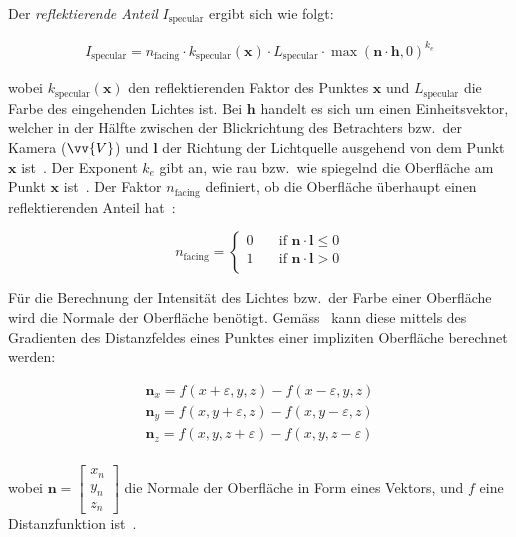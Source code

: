 Der \textit{reflektierende Anteil} $I_{\text{specular}}$ ergibt sich
wie folgt:

\begin{gather}
    I_{\text{specular}} = n_{\text{facing}} \cdot k_{\text{specular}}(\bm{x}) \cdot L_{\text{specular}} \cdot \max{(\bm{n} \cdot \bm{h}, 0)}^{k_{e}}
\end{gather}

wobei $k_{\text{specular}}(\bm{x})$ den reflektierenden Faktor des
Punktes $\bm{x}$ und $L_{\text{specular}}$ die Farbe des eingehenden
Lichtes ist. Bei $\bm{h}$ handelt es sich um einen Einheitsvektor,
welcher in der Hälfte zwischen der Blickrichtung des Betrachters bzw.\
der Kamera ($\vv{V}$) und $\bm{l}$ der Richtung der Lichtquelle
ausgehend von dem Punkt $\bm{x}$ ist~\parencite[S.
731]{glassner_introduction_1989}. Der Exponent $k_{e}$ gibt an, wie rau
bzw.\ wie spiegelnd die Oberfläche am Punkt $\bm{x}$
ist~\parencite[Kapitel 5, Abschnitt 5.2.1]{fernando_cg_2003}. Der Faktor
$n_{\text{facing}}$ definiert, ob die Oberfläche überhaupt einen
reflektierenden Anteil hat~\parencite[Kapitel 5, Abschnitt 5.2.1]{fernando_cg_2003}:

\begin{equation}
    n_{\text{facing}} = \begin{cases}
        0 & \quad \text{if } \bm{n} \cdot \bm{l} \leq 0\\
        1 & \quad \text{if } \bm{n} \cdot \bm{l} > 0 \\
    \end{cases}
\end{equation}

Für die Berechnung der Intensität des Lichtes bzw.\ der Farbe einer Oberfläche
wird die Normale der Oberfläche benötigt. Gemäss~\citeauthor{hart_ray_1989}
kann diese mittels des Gradienten des Distanzfeldes
eines Punktes einer impliziten Oberfläche berechnet werden:

\begin{gather}
    \bm{n}_{x} = f(x + \varepsilon, y, z) - f(x - \varepsilon, y, z) \\
    \bm{n}_{y} = f(x, y + \varepsilon,  z) - f(x, y - \varepsilon,  z) \\
    \bm{n}_{z} = f(x, y, z + \varepsilon) - f(x, y, z - \varepsilon) \\
\end{gather}

wobei $\bm{n} = \begin{bmatrix} x_{n} \\ y_{n} \\ z_{n} \end{bmatrix}$
die Normale der Oberfläche in Form eines Vektors, und $f$ eine
Distanzfunktion ist~\parencites[S. 292 bis 293]{hart_ray_1989}[S.
13]{hart_ray_1993}.

